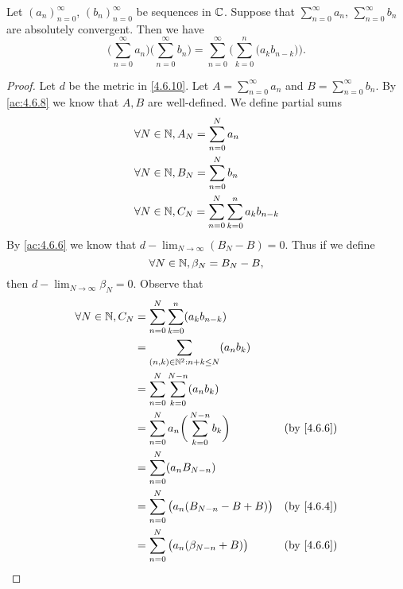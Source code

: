 \begin{ac}\label{ac:4.6.9}
  Let \((a_n)_{n = 0}^\infty\), \((b_n)_{n = 0}^\infty\) be sequences in \(\mathbb{C}\).
  Suppose that \(\sum_{n = 0}^\infty a_n\), \(\sum_{n = 0}^\infty b_n\) are absolutely convergent.
  Then we have
  \[
    \bigg(\sum_{n = 0}^\infty a_n\bigg) \bigg(\sum_{n = 0}^\infty b_n\bigg) = \sum_{n = 0}^\infty \bigg(\sum_{k = 0}^n \big(a_k b_{n - k}\big)\bigg).
  \]
\end{ac}

\begin{proof}
  Let \(d\) be the metric in \cref{4.6.10}.
  Let \(A = \sum_{n = 0}^\infty a_n\) and \(B = \sum_{n = 0}^\infty b_n\).
  By \cref{ac:4.6.8} we know that \(A, B\) are well-defined.
  We define partial sums
  \begin{align*}
     & \forall N \in \mathbb{N}, A_N = \sum_{n = 0}^N a_n                          \\
     & \forall N \in \mathbb{N}, B_N = \sum_{n = 0}^N b_n                          \\
     & \forall N \in \mathbb{N}, C_N = \sum_{n = 0}^N \sum_{k = 0}^n a_k b_{n - k}
  \end{align*}
  By \cref{ac:4.6.6} we know that \(d - \lim_{N \to \infty} (B_N - B) = 0\).
  Thus if we define
  \[
    \forall N \in \mathbb{N}, \beta_N = B_N - B,
  \]
  then \(d - \lim_{N \to \infty} \beta_N = 0\).
  Observe that
  \begin{align*}
    \forall N \in \N, C_N & = \sum_{n = 0}^N \sum_{k = 0}^n (a_k b_{n - k})                                                    \\
                          & = \sum_{(n, k) \in \N^2 : n + k \leq N} (a_n b_k)                                                  \\
                          & = \sum_{n = 0}^N \sum_{k = 0}^{N - n} (a_n b_k)                                                    \\
                          & = \sum_{n = 0}^N a_n \bigg(\sum_{k = 0}^{N - n} b_k\bigg)               & \text{(by \cref{4.6.6})} \\
                          & = \sum_{n = 0}^N (a_n B_{N - n})                                                                   \\
                          & = \sum_{n = 0}^N \big(a_n (B_{N - n} - B + B)\big)                      & \text{(by \cref{4.6.4})} \\
                          & = \sum_{n = 0}^N \big(a_n (\beta_{N - n} + B)\big)                      & \text{(by \cref{4.6.6})} \\

\end{align*}
\end{proof}
